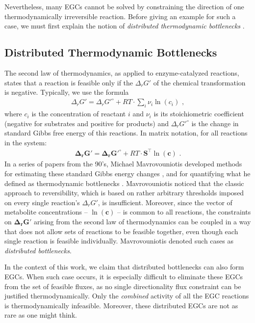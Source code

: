 \documentclass[twocolumn]{article}
\begin{document}
Nevertheless, many EGCs cannot be solved by constraining the direction of one thermodynamically irreversible reaction. Before giving an example for such a case, we must first explain the notion of \emph{distributed thermodynamic bottlenecks} \cite{Mavrovouniotis1996-dq, Mavrovouniotis1993-zq}.

\subsection{Distributed Thermodynamic Bottlenecks}
The second law of thermodynamics, as applied to enzyme-catalyzed reactions, states that a reaction is feasible only if the $\Delta_r G'$ of the chemical transformation is negative. Typically, we use the formula
\begin{eqnarray}
	\Delta_r G' = \Delta_r G'^\circ + RT \cdot \sum_i \nu_i \ln(c_i)\,\,,
\end{eqnarray}
where $c_i$ is the concentration of reactant $i$ and $\nu_i$ is its stoichiometric coefficient (negative for substrates and positive for products) and $\Delta_r G'^\circ$ is the change in standard Gibbs free energy of this reactions. In matrix notation, for all reactions in the system:
\begin{eqnarray}
\mathbf{\Delta_r G'} = \mathbf{\Delta_r G'^\circ} + RT \cdot \mathbf{S}^\top \ln(\mathbf{c})\,\,.
\end{eqnarray}
In a series of papers from the 90's, Michael Mavrovouniotis developed methods for estimating these standard Gibbs energy changes \cite{Mavrovouniotis1990-wv, Mavrovouniotis1991-kf}, and for quantifying what he defined as thermodynamic bottlenecks \cite{Mavrovouniotis1993-zq, Mavrovouniotis1996-dq}. Mavrovouniotis noticed that the classic approach to reversibility, which is based on rather arbitrary thresholds imposed on every single reaction's $\Delta_r G'$, is insufficient. Moreover, since the vector of metabolite concentrations -- $\ln(\mathbf{c})$ -- is common to all reactions, the constraints on $\mathbf{\Delta_r G'}$ arising from the second law of thermodynamics can be coupled in a way that does not allow sets of reactions to be feasible together, even though each single reaction is feasible individually. Mavrovouniotis denoted such cases as \emph{distributed bottlenecks}.

In the context of this work, we claim that distributed bottlenecks can also form EGCs. When such case occurs, it is especially difficult to eliminate these EGCs from the set of feasible fluxes, as no single directionality flux constraint can be justified thermodynamically. Only the \emph{combined} activity of all the EGC reactions is thermodynamically infeasible. Moreover, these distributed EGCs are not as rare as one might think.
\end{document}
